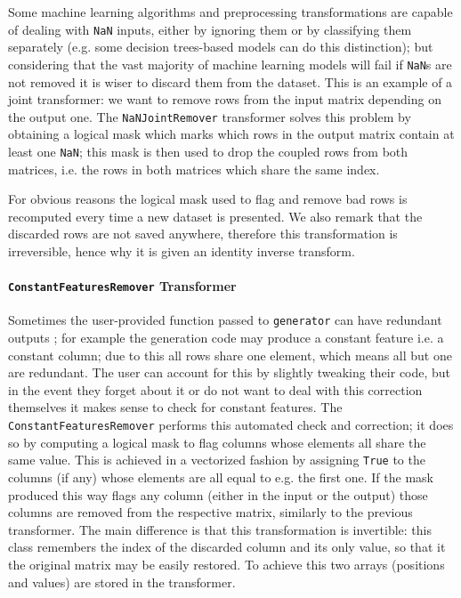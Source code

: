Some machine learning algorithms and preprocessing transformations are capable of dealing with \texttt{NaN} inputs, either by ignoring them or by classifying them separately (e.g. some decision trees-based models can do this distinction); but considering that the vast majority of machine learning models will fail if \texttt{NaN}s are not removed it is wiser to discard them from the dataset. This is an example of a joint transformer: we want to remove rows from the input matrix depending on the output one.
The \texttt{NaNJointRemover} transformer solves this problem by obtaining a logical mask which marks which rows in the output matrix contain at least one \texttt{NaN}; this mask is then used to drop the coupled rows from both matrices, i.e. the rows in both matrices which share the same index. 

For obvious reasons the logical mask used to flag and remove bad rows is recomputed every time a new dataset is presented.
We also remark that the discarded rows are not saved anywhere, therefore this transformation is irreversible, hence why it is given an identity inverse transform.

\paragraph{\texttt{ConstantFeaturesRemover} Transformer}
Sometimes the user-provided function passed to \texttt{generator} can have redundant outputs%
; for example the generation code may produce a constant feature i.e. a constant column; due to this all rows share one element, which means all but one are redundant.
The user can account for this by slightly tweaking their code, but in the event they forget about it or do not want to deal with this correction themselves it makes sense to check for constant features. 
The \texttt{ConstantFeaturesRemover} performs this automated check and correction; it does so by computing a logical mask to flag columns whose elements all share the same value. This is achieved in a vectorized fashion by assigning \texttt{True} to the columns (if any) whose elements are all equal to e.g. the first one. If the mask produced this way flags any column (either in the input or the output) those columns are removed from the respective matrix, similarly to the previous transformer. The main difference is that this transformation is invertible: this class remembers the index of the discarded column and its only value, so that it the original matrix may be easily restored. To achieve this two arrays (positions and values) are stored in the transformer.

